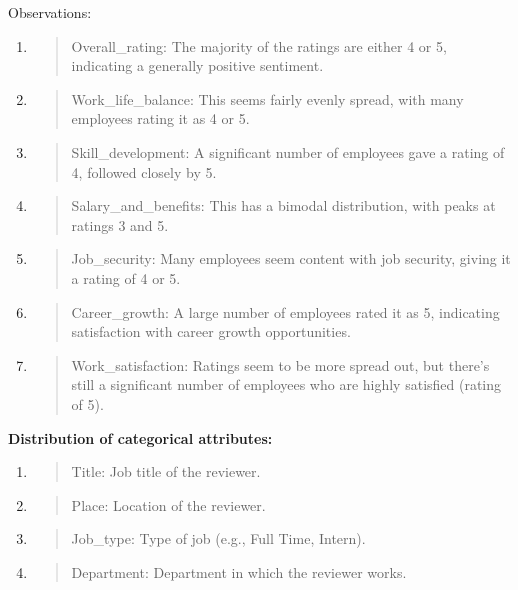 \documentclass[
]{article}
\begin{document}
Observations:

\begin{enumerate}
\def\labelenumi{\arabic{enumi}.}
\item
  \begin{quote}
  Overall\_rating: The majority of the ratings are either 4 or 5,
  indicating a generally positive sentiment.
  \end{quote}
\item
  \begin{quote}
  Work\_life\_balance: This seems fairly evenly spread, with many
  employees rating it as 4 or 5.
  \end{quote}
\item
  \begin{quote}
  Skill\_development: A significant number of employees gave a rating of
  4, followed closely by 5.
  \end{quote}
\item
  \begin{quote}
  Salary\_and\_benefits: This has a bimodal distribution, with peaks at
  ratings 3 and 5.
  \end{quote}
\item
  \begin{quote}
  Job\_security: Many employees seem content with job security, giving
  it a rating of 4 or 5.
  \end{quote}
\item
  \begin{quote}
  Career\_growth: A large number of employees rated it as 5, indicating
  satisfaction with career growth opportunities.
  \end{quote}
\item
  \begin{quote}
  Work\_satisfaction: Ratings seem to be more spread out, but there's
  still a significant number of employees who are highly satisfied
  (rating of 5).
  \end{quote}
\end{enumerate}

\textbf{Distribution of categorical attributes:}

\begin{enumerate}
\def\labelenumi{\arabic{enumi}.}
\item
  \begin{quote}
  Title: Job title of the reviewer.
  \end{quote}
\item
  \begin{quote}
  Place: Location of the reviewer.
  \end{quote}
\item
  \begin{quote}
  Job\_type: Type of job (e.g., Full Time, Intern).
  \end{quote}
\item
  \begin{quote}
  Department: Department in which the reviewer works.
  \end{quote}
\end{enumerate}
\end{document}
